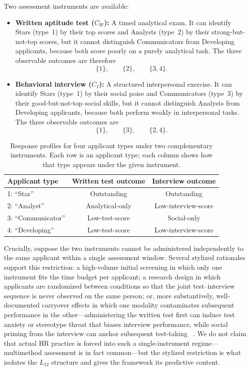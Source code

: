\documentclass{article}
\providecommand{\colrule}{\hline}
\begin{document}
Two assessment instruments are available:
\begin{itemize}
\item \textbf{Written aptitude test ($C_W$):} A timed analytical
exam. It can identify Stars (type~1) by their top scores and
Analysts (type~2) by their strong-but-not-top scores, but it cannot
distinguish Communicators from Developing applicants, because both
score poorly on a purely analytical task. The three observable
outcomes are therefore
\[
\{1\},\qquad \{2\},\qquad \{3,4\}.
\]
\item \textbf{Behavioral interview ($C_I$):} A structured
interpersonal exercise. It can identify Stars (type~1) by their
social poise and Communicators (type~3) by their good-but-not-top
social skills, but it cannot distinguish Analysts from Developing
applicants, because both perform weakly in interpersonal tasks. The
three observable outcomes are
\[
\{1\},\qquad \{3\},\qquad \{2,4\}.
\]
\end{itemize}

\begin{table}[b]
\caption{\label{tab:personnel}Response profiles for four applicant
types under two complementary instruments. Each row is an applicant
type; each column shows how that type appears under the given
instrument.}
\begin{center}
\begin{tabular}{lcc}
\colrule
Applicant type & Written test outcome & Interview outcome \\
\colrule
1: ``Star'' & Outstanding & Outstanding \\
2: ``Analyst'' & Analytical-only & Low-interview-score \\
3: ``Communicator'' & Low-test-score & Social-only \\
4: ``Developing'' & Low-test-score & Low-interview-score \\
\colrule
\end{tabular}
\end{center}
\end{table}

Crucially, suppose the two instruments cannot be administered
independently to the same applicant within a single assessment
window. Several stylized rationales support this restriction: a
high-volume initial screening in which only one instrument fits the
time budget per applicant; a research design in which applicants are
randomized between conditions so that the joint test--interview
sequence is never observed on the same person; or, more
substantively, well-documented carryover effects in which one
modality contaminates subsequent performance in the
other---administering the written test first can induce test anxiety
or stereotype threat that biases interview performance, while social
priming from the interview can anchor subsequent test-taking
~\cite{Tversky1974}. We do not claim that actual HR practice is
forced into such a single-instrument regime---multimethod assessment
is in fact common---but the stylized restriction is what isolates the
$L_{12}$ structure and gives the framework its predictive content.
\end{document}
